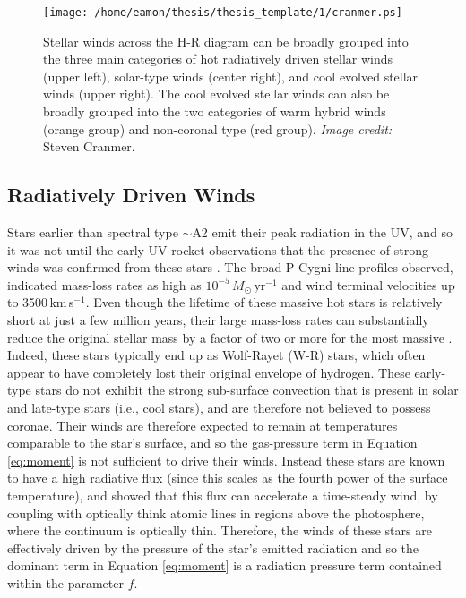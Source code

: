 \begin{figure}[hbt!]
\centering 
          \texttt{[image: /home/eamon/thesis/thesis\_template/1/cranmer.ps]}
\caption[Stellar winds across the H-R diagram]{Stellar winds across the H-R diagram can be broadly grouped into the three main categories of hot radiatively driven stellar winds (upper left), solar-type winds (center right), and cool evolved stellar winds (upper right). The cool evolved stellar winds can also be broadly grouped into the two categories of warm hybrid winds (orange group) and non-coronal type (red group). \textit{Image credit:} Steven Cranmer.}
\label{fig:1.2.3}
\end{figure}

\subsection{Radiatively Driven Winds}\label{sec:1.4.1}
Stars earlier than spectral type $\sim$A2 emit their peak radiation in the UV, and so it was not until the early UV rocket observations that the presence of strong winds was confirmed from these stars \citep[e.g.,][]{morton_1967}. The broad P Cygni line profiles observed, indicated mass-loss rates as high as $10^{-5}\,M_{\odot}$\,yr$^{-1}$ and wind terminal velocities up to 3500\,km\,s$^{-1}$. Even though the lifetime of these massive hot stars is relatively short at just a few million years, their large mass-loss rates can substantially reduce the original stellar mass by a factor of two or more for the most massive \citep{owocki_2004}. Indeed, these stars typically end up as Wolf-Rayet (W-R) stars, which often appear to have completely lost their original envelope of hydrogen. These early-type stars do not exhibit the strong sub-surface convection that is present in solar and late-type stars (i.e., cool stars), and are therefore not believed to possess coronae. Their winds are therefore expected to remain at temperatures comparable to the star's surface, and so the gas-pressure term in Equation \ref{eq:moment} is not sufficient to drive their winds. Instead these stars are known to have a high radiative flux (since this scales as the fourth power of the surface temperature), and \cite{castor_1975} showed that this flux can accelerate a time-steady wind, by coupling with optically think atomic lines in regions above the photosphere, where the continuum is optically thin. Therefore, the winds of these stars are effectively driven by the pressure of the star's emitted radiation and so the dominant term in Equation \ref{eq:moment} is a radiation pressure term contained within the parameter $f$.


